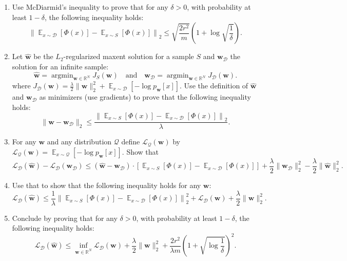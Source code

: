 \documentclass[letterpaper, 11pt]{article}
\newcommand{\1}{\mathds{1}}	%
\theoremstyle{definition}
\begin{document}
\begin{enumerate}
    \item Use McDiarmid's inequality to prove that for any $\delta > 0$, with probability at least $1 - \delta$, the following inequality holds:
    \[
    \left\| \mathop{\mathbb{E}}_{x \sim \mathcal{D}}[\Phi(x)] - \mathop{\mathbb{E}}_{x \sim S}[\Phi(x)] \right\|_2 \leq \sqrt{\frac{2r^2}{m}} \left( 1 + \log \sqrt{\frac{1}{\delta}} \right).
    \]
    
    \item Let $\widehat{\mathbf{w}}$ be the $L_2$-regularized maxent solution for a sample $S$ and $\mathbf{w}_{\mathcal{D}}$ the solution for an infinite sample:
    \[
    \widehat{\mathbf{w}} = \mathop{\text{argmin}}_{\mathbf{w} \in \mathbb{R}^N} J_S(\mathbf{w}) \quad \text{and} \quad \mathbf{w}_{\mathcal{D}} = \mathop{\text{argmin}}_{\mathbf{w} \in \mathbb{R}^N} J_{\mathcal{D}}(\mathbf{w}).
    \]
    where $J_{\mathcal{D}}(\mathbf{w}) = \frac{\lambda}{2} \|\mathbf{w}\|_2^2 + \mathop{\mathbb{E}}_{x \sim \mathcal{D}} \left[ -\log p_{\mathbf{w}}[x] \right]$. Use the definition of $\widehat{\mathbf{w}}$ and $\mathbf{w}_{\mathcal{D}}$ as minimizers (use gradients) to prove that the following inequality holds:
    \[
    \|\widehat{\mathbf{w}} - \mathbf{w}_{\mathcal{D}}\|_2 \leq \frac{\left\| \mathop{\mathbb{E}}_{x \sim S}[\Phi(x)] - \mathop{\mathbb{E}}_{x \sim \mathcal{D}}[\Phi(x)] \right\|_2}{\lambda}.
    \]
    
    \item For any $\mathbf{w}$ and any distribution $\mathcal{Q}$ define $\mathcal{L}_{\mathcal{Q}}(\mathbf{w})$ by $\mathcal{L}_{\mathcal{Q}}(\mathbf{w}) = \mathop{\mathbb{E}}_{x \sim \mathcal{Q}}[-\log p_{\mathbf{w}}[x]]$. Show that
    \[
    \mathcal{L}_{\mathcal{D}}(\widehat{\mathbf{w}}) - \mathcal{L}_{\mathcal{D}}(\mathbf{w}_{\mathcal{D}}) \leq (\widehat{\mathbf{w}} - \mathbf{w}_{\mathcal{D}}) \cdot \left[ \mathop{\mathbb{E}}_{x \sim S}[\Phi(x)] - \mathop{\mathbb{E}}_{x \sim \mathcal{D}}[\Phi(x)] \right] + \frac{\lambda}{2} \|\mathbf{w}_{\mathcal{D}}\|_2^2 - \frac{\lambda}{2} \|\widehat{\mathbf{w}}\|_2^2.
    \]
    
    \item Use that to show that the following inequality holds for any $\mathbf{w}$:
    \[
    \mathcal{L}_{\mathcal{D}}(\widehat{\mathbf{w}}) \leq \frac{1}{\lambda} \left\| \mathop{\mathbb{E}}_{x \sim S}[\Phi(x)] - \mathop{\mathbb{E}}_{x \sim \mathcal{D}}[\Phi(x)] \right\|_2^2 + \mathcal{L}_{\mathcal{D}}(\mathbf{w}) + \frac{\lambda}{2} \|\mathbf{w}\|_2^2.
    \]
    
    \item Conclude by proving that for any $\delta > 0$, with probability at least $1 - \delta$, the following inequality holds:
    \[
    \mathcal{L}_{\mathcal{D}}(\widehat{\mathbf{w}}) \leq \inf_{\mathbf{w} \in \mathbb{R}^N} \mathcal{L}_{\mathcal{D}}(\mathbf{w}) + \frac{\lambda}{2} \|\mathbf{w}\|_2^2 + \frac{2r^2}{\lambda m} \left( 1 + \sqrt{\log \frac{1}{\delta}} \right)^2.
    \]
\end{enumerate}
\end{document}
